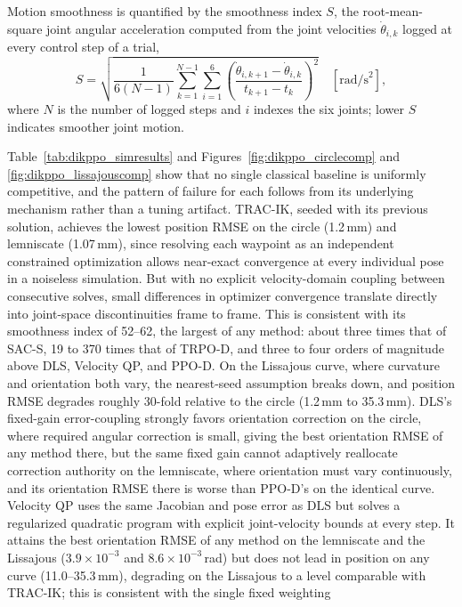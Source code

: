 Motion smoothness is quantified by the smoothness index $S$, the root-mean-square joint angular
acceleration computed from the joint velocities $\dot{\theta}_{i,k}$ logged at every control step of
a trial,
\begin{equation}
S = \sqrt{\frac{1}{6(N-1)}\sum_{k=1}^{N-1}\sum_{i=1}^{6}\left(\frac{\dot{\theta}_{i,k+1}-\dot{\theta}_{i,k}}{t_{k+1}-t_k}\right)^{2}}\quad [\text{rad/s}^{2}],
\label{eq:dikppo_smoothness}
\end{equation}
where $N$ is the number of logged steps and $i$ indexes the six joints; lower $S$ indicates smoother
joint motion.

Table~\ref{tab:dikppo_simresults} and Figures~\ref{fig:dikppo_circlecomp} and
\ref{fig:dikppo_lissajouscomp} show that no single classical baseline is uniformly competitive, and
the pattern of failure for each follows from its underlying mechanism rather than a tuning artifact.
TRAC-IK, seeded with its previous solution, achieves the lowest position RMSE on the circle
(1.2\,mm) and lemniscate (1.07\,mm), since resolving each waypoint as an independent constrained
optimization allows near-exact convergence at every individual pose in a noiseless simulation. But
with no explicit velocity-domain coupling between consecutive solves, small differences in optimizer
convergence translate directly into joint-space discontinuities frame to frame. This is consistent
with its smoothness index of 52--62, the largest of any method: about three times that of SAC-S,
19 to 370 times that of TRPO-D, and three to four orders of magnitude above DLS, Velocity QP, and
PPO-D. On the Lissajous curve, where curvature and orientation both vary, the nearest-seed
assumption breaks down, and position RMSE degrades roughly 30-fold relative to the circle (1.2\,mm
to 35.3\,mm). DLS's fixed-gain error-coupling strongly favors orientation correction on the circle,
where required angular correction is small, giving the best orientation RMSE of any method there,
but the same fixed gain cannot adaptively reallocate correction authority on the lemniscate, where
orientation must vary continuously, and its orientation RMSE there is worse than PPO-D's on the
identical curve. Velocity QP uses the same Jacobian and pose error as DLS but solves a regularized
quadratic program with explicit joint-velocity bounds at every step. It attains the best
orientation RMSE of any method on the lemniscate and the Lissajous ($3.9\times10^{-3}$ and
$8.6\times10^{-3}$\,rad) but does not lead in position on any curve (11.0--35.3\,mm), degrading on
the Lissajous to a level comparable with TRAC-IK; this is consistent with the single fixed weighting
